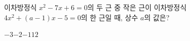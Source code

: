 이차방정식 $x^2-7x+6=0$의 두 근 중 작은 근이 이차방정식 $4x^2+(a-1)x-5=0$의 한 근일 때, 상수 $a$의 값은?
\begin{choices32}{$-3$}{$-2$}{$-1$}{$1$}{$2$}\end{choices32}
